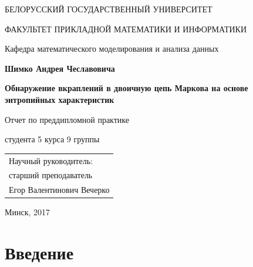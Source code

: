 \documentclass[a4paper,12pt]{article}
\theoremstyle{plain}
\begin{document}
\thispagestyle{empty}


\begin{center}
	\MakeTextUppercase{Белорусский Государственный Университет}\par 
	\MakeTextUppercase{Факультет Прикладной Математики и Информатики}\par
	Кафедра математического моделирования и анализа данных
	\par
\end{center}

\vspace*{3cm}
\begin{center}
	{\bf \large Шимко Андрея Чеславовича}
\end{center}
\vspace*{1cm}
\begin{center}
	{\bf \large Обнаружение вкраплений в двоичную цепь Маркова на основе энтропийных характеристик}
\end{center}

\vspace*{1cm}

\begin{center}
	Отчет по преддипломной практике
\end{center}
\begin{center}
	студента 5 курса 9 группы
\end{center}


\vspace{5cm}

\begin{flushright}
	\begin{tabular}{l}
		Научный руководитель:\\
		старший преподаватель\\
		Егор Валентинович Вечерко
	\end{tabular}
\end{flushright}


\par\vspace*{\fill}

\begin{center}
	{Минск, 2017}
\end{center}
\newpage


\thispagestyle{empty}

 
\clearpage

\newpage
\section{Введение}
\vspace*{1cm}
\end{document}
